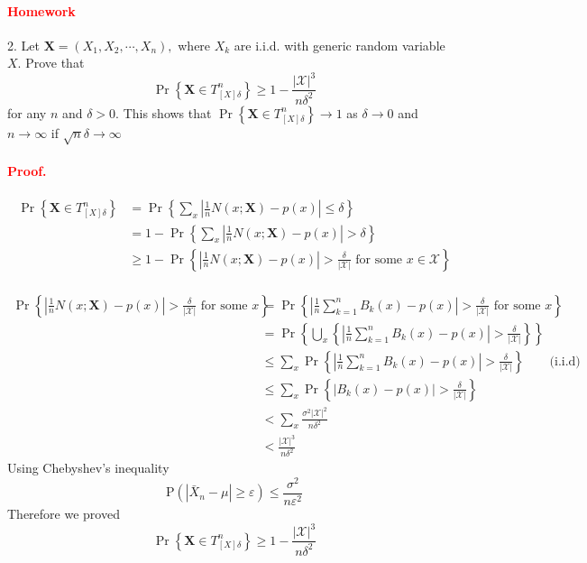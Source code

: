\documentclass[8pt]{article}
\begin{document}
\begin{enumerate}
\paragraph{\textcolor{red}{Homework}}
2. Let $\mathbf{X}=\left(X_{1}, X_{2}, \cdots, X_{n}\right),$ where $X_{k}$ are i.i.d. with generic random variable $X .$ Prove that
$$
\operatorname{Pr}\left\{\mathbf{X} \in T_{[X] \delta}^{n}\right\} \geq 1-\frac{|\mathcal{X}|^{3}}{n \delta^{2}}
$$
for any $n$ and $\delta>0 .$ This shows that $\operatorname{Pr}\left\{\mathbf{X} \in T_{[X] \delta}^{n}\right\} \rightarrow 1$ as $\delta \rightarrow 0$ and $n \rightarrow \infty$ if $\sqrt{n} \delta \rightarrow \infty$
\paragraph{\textcolor{red}{Proof.}}
$$
\begin{aligned}
	\operatorname{Pr}\left\{\mathbf{X} \in T_{[X] \delta}^{n}\right\} 
	&=\operatorname{Pr}\left\{\sum_{x}\left|\frac{1}{n} N(x ; \mathbf{X})-p(x)\right| \leq \delta\right\} \\
	&=1-\operatorname{Pr}\left\{\sum_{x}\left|\frac{1}{n} N(x ; \mathbf{X})-p(x)\right|>\delta\right\} \\
	&\geq 1-\operatorname{Pr}\left\{\left|\frac{1}{n} N(x ; \mathbf{X})-p(x)\right|>\frac{\delta}{|\mathcal{X}|} \text { for some } x \in \mathcal{X}\right\} \\
\end{aligned}
$$

$$
\begin{aligned}
	\operatorname{Pr}\left\{\left|\frac{1}{n} N(x ; \mathbf{X})-p(x)\right|>\frac{\delta}{|\mathcal{X}|} \text { for some } x\right\} 
	&=\operatorname{Pr}\left\{\left|\frac{1}{n} \sum_{k=1}^{n} B_{k}(x)-p(x)\right|>\frac{\delta}{|\mathcal{X}|} \text { for some } x\right\} \\
	&=\operatorname{Pr}\left\{\bigcup_{x}\left\{\left|\frac{1}{n} \sum_{k=1}^{n} B_{k}(x)-p(x)\right|>\frac{\delta}{|\mathcal{X}|}\right\}\right\} \\
	&\leq \sum_{x} \operatorname{Pr}\left\{\left|\frac{1}{n} \sum_{k=1}^{n} B_{k}(x)-p(x)\right|>\frac{\delta}{|\mathcal{X}|}\right\}  \qquad \text{(i.i.d)}\\
	&\leq \sum_{x} \operatorname{Pr}\left\{\left| B_{k}(x)-p(x)\right|>\frac{\delta}{|\mathcal{X}|}\right\} \\
	&<\sum_{x} \frac{\sigma^{2}   |\mathcal{X}|^2 }{n \delta^{2}} \\
	&< \frac{|\mathcal{X}|^{3}}{n \delta^{2}}
\end{aligned}
$$
Using Chebyshev's inequality
$$
\mathrm{P}\left(\left|\bar{X}_{n}-\mu\right| \geq \varepsilon\right) \leq \frac{\sigma^{2}}{n \varepsilon^{2}}
$$
Therefore we proved
$$
\operatorname{Pr}\left\{\mathbf{X} \in T_{[X] \delta}^{n}\right\} \geq 1-\frac{|\mathcal{X}|^{3}}{n \delta^{2}}
$$
\begin{tcolorbox}

\end{tcolorbox}
\end{enumerate}
\end{document}
